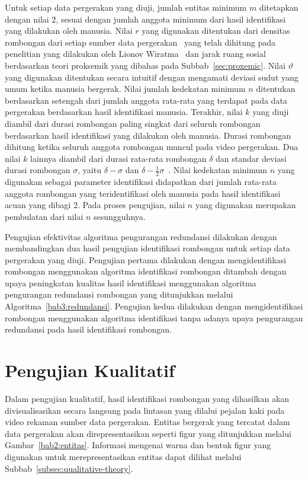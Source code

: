 Untuk setiap data pergerakan yang diuji, jumlah entitas minimum $m$ ditetapkan dengan nilai $2$, sesuai dengan jumlah anggota minimum dari hasil identifikasi yang dilakukan oleh manusia. Nilai $r$ yang digunakan ditentukan dari densitas rombongan dari setiap sumber data pergerakan~\cite{solera:06:range-reference} yang telah dihitung pada penelitian yang dilakukan oleh Lionov Wiratma~\cite{wiratma:software} dan jarak ruang sosial berdasarkan teori proksemik yang dibahas pada Subbab~\ref{sec:proxemic}. Nilai $\vartheta$ yang digunakan ditentukan secara intuitif dengan mengamati deviasi sudut yang umum ketika manusia bergerak. Nilai jumlah kedekatan minimum $n$ ditentukan berdasarkan setengah dari jumlah anggota rata-rata yang terdapat pada data pergerakan berdasarkan hasil identifikasi manusia. Terakhir, nilai $k$ yang diuji diambil dari durasi rombongan paling singkat dari seluruh rombongan berdasarkan hasil identifikasi yang dilakukan oleh manusia. Durasi rombongan dihitung ketika seluruh anggota rombongan muncul pada video pergerakan. Dua nilai $k$ lainnya diambil dari durasi rata-rata rombongan $\delta$ dan standar deviasi durasi rombongan $\sigma$, yaitu $\delta - \sigma$ dan $\delta - \frac{1}{2}\sigma$~\cite{wiratma:software}. Nilai kedekatan minimum $n$ yang digunakan sebagai parameter identifikasi didapatkan dari jumlah rata-rata anggota rombongan yang teridentifikasi oleh manusia pada hasil identifikasi acuan yang dibagi $2$. Pada proses pengujian, nilai $n$ yang digunakan merupakan pembulatan dari nilai $n$ sesungguhnya. 

Pengujian efektivitas algoritma pengurangan redundansi dilakukan dengan membandingkan dua hasil pengujian identifikasi rombongan untuk setiap data pergerakan yang diuji. Pengujian pertama dilakukan dengan mengidentifikasi rombongan menggunakan algoritma identifikasi rombongan ditambah dengan upaya peningkatan kualitas hasil identifikasi menggunakan algoritma pengurangan redundansi rombongan yang ditunjukkan melalui Algoritma~\ref{bab3:redundansi}. Pengujian kedua dilakukan dengan mengidentifikasi rombongan menggunakan algoritma identifikasi tanpa adanya upaya pengurangan redundansi pada hasil identifikasi rombongan.

\section{Pengujian Kualitatif}
\label{sec:qualitative}

Dalam pengujian kualitatif, hasil identifikasi rombongan yang dihasilkan akan divisualisasikan secara langsung pada lintasan yang dilalui pejalan kaki pada video rekaman sumber data pergerakan. Entitas bergerak yang tercatat dalam data pergerakan akan direpresentasikan seperti figur yang ditunjukkan melalui Gambar~\ref{bab2:entitas}. Informasi mengenai warna dan bentuk figur yang digunakan untuk merepresentasikan entitas dapat dilihat melalui Subbab~\ref{subsec:qualitative-theory}.

